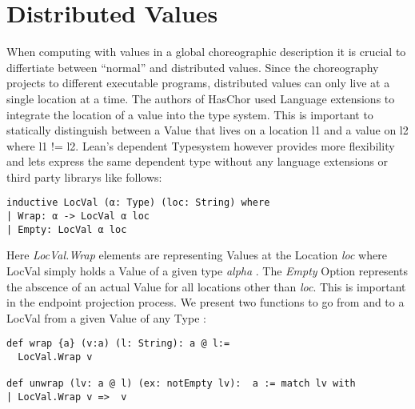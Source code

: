 \section{Distributed Values}
When computing with values in a global choreographic description it is crucial to differtiate between ``normal'' and distributed values. Since the choreography projects to different executable programs, distributed values can only live at a single location at a time. The authors of HasChor used Language extensions to integrate the location of a value into the type system. This is important to statically distinguish between a Value that lives on a location l1 and a value on l2 where l1 != l2.
Lean's dependent Typesystem however provides more flexibility and lets express the same dependent type without any language extensions or third party librarys like follows:
\begin{lstlisting}[language=lean]
inductive LocVal (α: Type) (loc: String) where
| Wrap: α -> LocVal α loc
| Empty: LocVal α loc
\end{lstlisting}
Here \emph{LocVal.Wrap} elements are representing Values at the Location \emph{loc} where LocVal simply holds a Value of a given type \emph{ alpha }.
The \emph{Empty} Option represents the abscence of an actual \emph{\alpha} Value for all locations other than \emph{loc}. This is important in the endpoint projection process. We present two functions to go from and to a LocVal from a given Value of any Type \alpha:

\begin{lstlisting}[language=lean]
def wrap {a} (v:a) (l: String): a @ l:=
  LocVal.Wrap v

def unwrap (lv: a @ l) (ex: notEmpty lv):  a := match lv with
| LocVal.Wrap v =>  v

\end{lstlisting}
